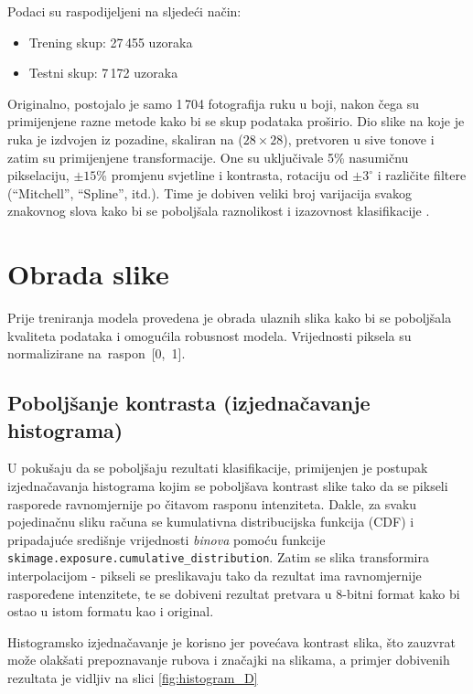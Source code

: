 \documentclass[a4paper,twocolumn]{article}
\begin{document}
Podaci su raspodijeljeni na sljedeći način:
\begin{itemize}
    \item Trening skup: 27\,455 uzoraka
    \item Testni skup: 7\,172 uzoraka
\end{itemize}

Originalno, postojalo je samo 1\,704 fotografija ruku u boji, nakon čega su primijenjene razne metode kako bi se skup podataka proširio. Dio slike na koje je ruka je izdvojen iz pozadine, skaliran na ($28 \times 28$), pretvoren u sive tonove i zatim su primijenjene transformacije. One su uključivale 5\% nasumičnu pikselaciju, $\pm 15$\% promjenu svjetline i kontrasta, rotaciju od $\pm 3^\circ$ i različite filtere (``Mitchell'', ``Spline'', itd.). Time je dobiven veliki broj varijacija svakog znakovnog slova kako bi se poboljšala raznolikost i izazovnost klasifikacije \cite{asl_dataset}.



\section{Obrada slike}

Prije treniranja modela provedena je obrada ulaznih slika kako bi se poboljšala kvaliteta podataka i omogućila robusnost modela. Vrijednosti piksela su normalizirane na raspon [0, 1].



\subsection{Poboljšanje kontrasta (izjednačavanje histograma)}

U pokušaju da se poboljšaju rezultati klasifikacije, primijenjen je postupak izjednačavanja histograma kojim se poboljšava kontrast slike tako da se pikseli rasporede ravnomjernije po čitavom rasponu intenziteta. Dakle, za svaku pojedinačnu sliku računa se kumulativna distribucijska funkcija (CDF) i pripadajuće središnje vrijednosti \emph{binova} pomoću funkcije \texttt{skimage.exposure.cumulative\_distribution}. Zatim se slika transformira interpolacijom - pikseli se preslikavaju tako da rezultat ima ravnomjernije raspoređene intenzitete, te se dobiveni rezultat pretvara u 8-bitni format kako bi ostao u istom formatu kao i original.




Histogramsko izjednačavanje je korisno jer povećava kontrast slika, što zauzvrat može olakšati prepoznavanje rubova i značajki na slikama, a primjer dobivenih rezultata je vidljiv na slici \ref{fig:histogram_D}
\end{document}
